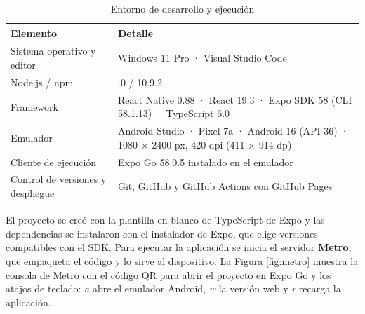\clearpage
{}

\vspace{0.2cm}

\begin{table}[H]
\centering\small
\caption{Entorno de desarrollo y ejecución}\label{tab:entorno}
\renewcommand{\arraystretch}{1.25}
\begin{tabular}{|>{\raggedright\arraybackslash}p{}|>{\raggedright\arraybackslash}p{}|}
\hline
\rowcolor{colabpyblue} \color{white}\textbf{Elemento} & \color{white}\textbf{Detalle} \\ \hline
Sistema operativo y editor & Windows 11 Pro · Visual Studio Code \\ \hline
\rowcolor{colabpybg} Node.js / npm & 22.14.0 / 10.9.2 \\ \hline
Framework & React Native 0.88 · React 19.3 · Expo SDK 58 (CLI 58.1.13) · TypeScript 6.0 \\ \hline
\rowcolor{colabpybg} Emulador & Android Studio · Pixel 7a · Android 16 (API 36) · 1080 × 2400 px, 420 dpi (411 × 914 dp) \\ \hline
Cliente de ejecución & Expo Go 58.0.5 instalado en el emulador \\ \hline
\rowcolor{colabpybg} Control de versiones y despliegue & Git, GitHub y GitHub Actions con GitHub Pages \\ \hline
\end{tabular}
\end{table}

\vspace{0.2cm}

El proyecto se creó con la plantilla en blanco de TypeScript de Expo y las dependencias se instalaron con el instalador de Expo, que elige versiones compatibles con el SDK. Para ejecutar la aplicación se inicia el servidor \textbf{Metro}, que empaqueta el código y lo sirve al dispositivo. La Figura \ref{fig:metro} muestra la consola de Metro con el código QR para abrir el proyecto en Expo Go y los atajos de teclado: \textit{a} abre el emulador Android, \textit{w} la versión web y \textit{r} recarga la aplicación.

